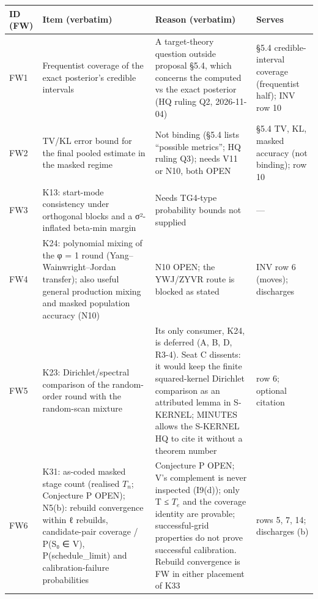 {\footnotesize
\begin{xltabular}{\textwidth}{@{}>{\raggedright\arraybackslash}p{1.25cm} >{\raggedright\arraybackslash}X >{\raggedright\arraybackslash}X >{\raggedright\arraybackslash}p{2.5cm}@{}}
\toprule
ID (FW) & Item (verbatim) & Reason (verbatim) & Serves \\
\midrule
\endhead
{} FW1 & Frequentist coverage of the exact posterior's credible intervals & A target-theory question outside proposal §5.4, which concerns the computed vs the exact posterior (HQ ruling Q2, 2026-11-04)  & §5.4 credible-interval coverage (frequentist half); INV row 10 \\
 FW2 & TV/KL error bound for the final pooled estimate in the masked regime & Not binding (§5.4 lists ``possible metrics''; HQ ruling Q3); needs V11 or N10, both OPEN  & §5.4 TV, KL, masked accuracy (not binding); row 10 \\
 FW3 & K13: start-mode consistency under orthogonal blocks and a σ²-inflated beta-min margin & Needs TG4-type probability bounds not supplied  & --- \\
 FW4 & K24: polynomial mixing of the φ = 1 round (Yang–Wainwright–Jordan transfer); also useful general production mixing and masked population accuracy (N10) & N10 OPEN; the YWJ/ZYVR route is blocked as stated  & INV row 6 (moves); discharges  \\
 FW5 & K23: Dirichlet/spectral comparison of the random-order round with the random-scan mixture & Its only consumer, K24, is deferred (A, B, D, R3-4). Seat C dissents: it would keep the finite squared-kernel Dirichlet comparison as an attributed lemma in S-KERNEL; MINUTES allows the S-KERNEL HQ to cite it without a theorem number  & row 6; optional citation  \\
 FW6 & K31: as-coded masked stage count (realised $T_n$; Conjecture P OPEN); N5(b): rebuild convergence within ℓ rebuilds, candidate-pair coverage / P(S₀ ∈ V), P(schedule\_limit) and calibration-failure probabilities & Conjecture P OPEN; V's complement is never inspected (I9(d)); only T ≤ $T_e$ and the coverage identity are provable; successful-grid properties do not prove successful calibration. Rebuild convergence is FW in either placement of K33  & rows 5, 7, 14; discharges (b) \\

\end{xltabular}}
